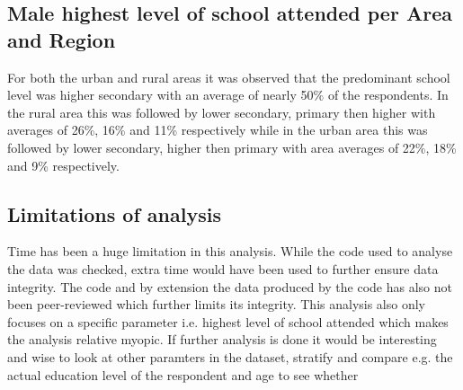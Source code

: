 \documentclass[stu, 12pt, floatsintext,longtable]{apa7}
\begin{document}
\subsection{Male highest level of school attended per Area and Region}
For both the urban and rural areas it was observed that the predominant school
level was higher secondary with an average of nearly 50\% of the respondents.
In the rural area this was followed by lower secondary, primary then higher
with averages of 26\%, 16\% and 11\% respectively while in the
urban area this was followed by lower secondary, higher then primary with area
averages of 22\%, 18\% and 9\%
respectively.

\subsection{Limitations of analysis}

Time has been a huge limitation in this analysis.
While the code used to analyse the data was checked, extra time would have been
used to further ensure data integrity. The code and by extension the data
produced
by
the code has also not been peer-reviewed which further limits its integrity.
This analysis
also only focuses on a specific parameter i.e. highest level of school
attended which makes the analysis relative myopic. If further analysis is done
it would be interesting and wise to look at other paramters in the dataset,
stratify and compare e.g.
the actual education level of the respondent and age to see whether
\printbibliography
\end{document}
